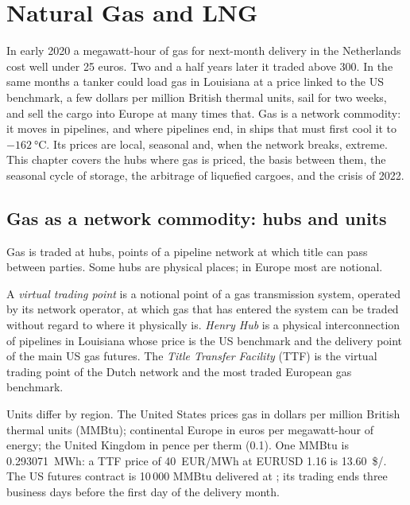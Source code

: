 \chapter{Natural Gas and LNG}\label{ch:m3:natural-gas-and-lng}

In early 2020 a megawatt-hour of gas for next-month delivery in the Netherlands cost
well under 25 euros. Two and a half years later it traded above 300. In the same
months a tanker could load gas in Louisiana at a price linked to the US benchmark,
a few dollars per million British thermal units, sail for two weeks, and sell the
cargo into Europe at many times that. Gas is a network commodity: it moves in
pipelines, and where pipelines end, in ships that must first cool it to
$-\qty{162}{\degreeCelsius}$. Its prices are local, seasonal and, when the network
breaks, extreme. This chapter covers the hubs where gas is priced, the basis between
them, the seasonal cycle of storage, the arbitrage of liquefied cargoes, and the crisis
of 2022.

\section{Gas as a network commodity: hubs and units}

Gas is traded at hubs, points of a pipeline network at which title can pass
between parties. Some hubs are physical places; in Europe most are notional.

\begin{definition}\label{def:m3:natural-gas-and-lng:hubs}
A \emph{virtual trading point} is a notional point of a
gas transmission system, operated by its network operator, at which gas that has
entered the system can be traded without regard to where it physically is.
\emph{Henry Hub} is a physical interconnection of pipelines in
Louisiana whose price is the US benchmark and the delivery point of the main US gas
futures. The \emph{Title Transfer Facility} (TTF) is the
virtual trading point of the Dutch network and the most traded European gas benchmark.
\end{definition}

Units differ by region. The United States prices gas in dollars per million British
thermal units (MMBtu); continental Europe in euros per megawatt-hour of energy; the
United Kingdom in pence per therm (\qty{0.1}{\mmbtu}). One MMBtu is \qty{0.293071}{MWh}:
a TTF price of \qty{40}{EUR/MWh} at EURUSD 1.16 is \qty{13.60}{\$/\mmbtu}. The US
futures contract is 10\,000 MMBtu delivered at ; its trading ends three
business days before the first day of the delivery month.

